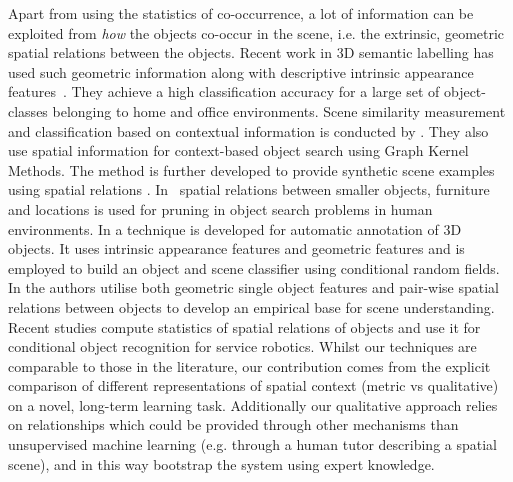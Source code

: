 \documentclass[letterpaper, 10 pt, conference]{ieeeconf}  %
\begin{document}
Apart from using the statistics of co-occurrence, a lot of information can be exploited from \textit{how} the objects co-occur in the scene, i.e. the extrinsic, geometric spatial relations between the objects. Recent work in 3D semantic labelling has used such geometric information along with descriptive intrinsic appearance features~\cite{Koppula:NIPS2011}. They achieve a high classification accuracy for a large set of object-classes belonging to home and office environments. Scene similarity measurement and classification based on contextual information is conducted by \cite{Fisher:ACMT2011}. They also use spatial information for context-based object search using Graph Kernel Methods. The method is further developed to provide synthetic scene examples using spatial relations \cite{Fisher:ACMT2012}. In~\cite{Aydemir:ICRA2011} spatial relations between smaller objects, furniture and locations is used for pruning in object search problems in human environments. In \cite{Lin:ICCV2013} a technique is developed for automatic annotation of 3D objects. It uses intrinsic appearance features and geometric features and is employed to build an object and scene classifier using conditional random fields. In \cite{kasper:2011} the authors utilise both geometric single object features and pair-wise spatial relations between objects to develop an empirical base for scene understanding. Recent studies \cite{Southey:2007,kasper:2011} compute statistics of spatial relations of objects and use it for conditional object recognition for service robotics. Whilst our techniques are comparable to those in the literature, our contribution comes from the explicit comparison of different representations of spatial context (metric vs qualitative) on a novel, long-term learning task. Additionally our qualitative approach relies on relationships which could be provided through other mechanisms than unsupervised machine learning (e.g. through a human tutor describing a spatial scene), and in this way bootstrap the system using expert knowledge.
\end{document}
